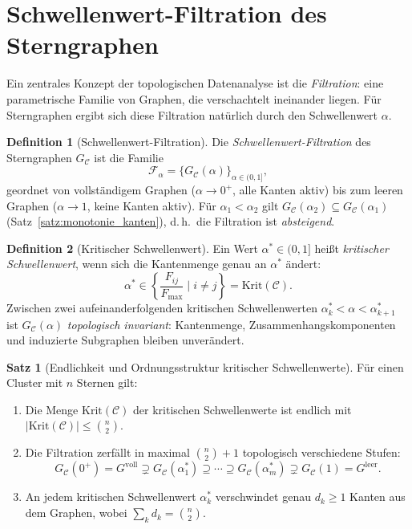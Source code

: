 ﻿\documentclass[a4paper,12pt]{report}
\theoremstyle{definition}
\newtheorem{definition}{Definition}
\newtheorem{satz}{Satz}
\begin{document}
\section{Schwellenwert-Filtration des Sterngraphen}
\label{sec:filtration}

Ein zentrales Konzept der topologischen Datenanalyse ist die \emph{Filtration}: eine parametrische Familie von Graphen, die verschachtelt ineinander liegen. Für Sterngraphen ergibt sich diese Filtration natürlich durch den Schwellenwert $\alpha$.

\begin{definition}[Schwellenwert-Filtration]
\label{def:filtration}
Die \emph{Schwellenwert-Filtration} des Sterngraphen $G_\mathcal{C}$ ist die Familie
\[
\mathcal{F}_\alpha = \{G_\mathcal{C}(\alpha)\}_{\alpha \in (0,1]},
\]
geordnet von vollständigem Graphen ($\alpha \to 0^+$, alle Kanten aktiv) bis zum leeren Graphen ($\alpha \to 1$, keine Kanten aktiv). Für $\alpha_1 < \alpha_2$ gilt $G_\mathcal{C}(\alpha_2) \subseteq G_\mathcal{C}(\alpha_1)$ (Satz~\ref{satz:monotonie_kanten}), d.\,h.\ die Filtration ist \emph{absteigend}.
\end{definition}

\begin{definition}[Kritischer Schwellenwert]
\label{def:kritischer_alpha}
Ein Wert $\alpha^* \in (0, 1]$ heißt \emph{kritischer Schwellenwert}, wenn sich die Kantenmenge genau an $\alpha^*$ ändert:
\[
\alpha^* \in \left\{\frac{F_{ij}}{F_\mathrm{max}} \;\bigg|\; i \neq j\right\} = \text{Krit}(\mathcal{C}).
\]
Zwischen zwei aufeinanderfolgenden kritischen Schwellenwerten $\alpha^*_k < \alpha < \alpha^*_{k+1}$ ist $G_\mathcal{C}(\alpha)$ \emph{topologisch invariant}: Kantenmenge, Zusammenhangskomponenten und induzierte Subgraphen bleiben unverändert.
\end{definition}

\begin{satz}[Endlichkeit und Ordnungsstruktur kritischer Schwellenwerte]
\label{satz:endlichkeit}
Für einen Cluster mit $n$ Sternen gilt:
\begin{enumerate}[label=(\roman*)]
    \item Die Menge $\mathrm{Krit}(\mathcal{C})$ der kritischen Schwellenwerte ist endlich mit $|\mathrm{Krit}(\mathcal{C})| \leq \binom{n}{2}$.
    \item Die Filtration zerfällt in maximal $\binom{n}{2} + 1$ topologisch verschiedene Stufen:
          \[G_\mathcal{C}(0^+) = G^\mathrm{voll} \supsetneq G_\mathcal{C}(\alpha^*_1) \supseteq \cdots
           \supseteq G_\mathcal{C}(\alpha^*_m) \supsetneq G_\mathcal{C}(1) = G^\mathrm{leer}.\]
    \item An jedem kritischen Schwellenwert $\alpha^*_k$ verschwindet genau $d_k \geq 1$ Kanten aus dem Graphen, wobei $\sum_k d_k = \binom{n}{2}$.
\end{enumerate}
\end{satz}
\end{document}
